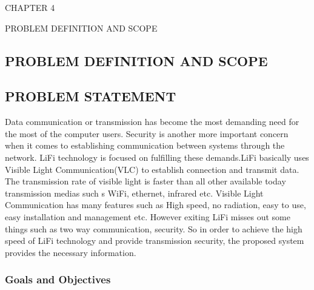 \documentclass[12pt,a4paper]
{article}
\numberwithin{table}{section}
\begin{document}
{{{\begin{minipage}{15cm}


\vspace{4 in}
 \begin{center} 
\begin{Huge}
CHAPTER 4

\vspace{0.5 in}

PROBLEM DEFINITION AND SCOPE
\end{Huge}

\end{center}
\end{minipage}

\newpage
\begin{center}
\section{PROBLEM DEFINITION AND SCOPE}
\end{center}
 {\setlength{\baselineskip}{1.0\baselineskip} 		

  

\hspace{50pt}



\subsection{PROBLEM STATEMENT}

\par \hspace{0.2 in}Data communication or transmission has become the most demanding need for the most of the computer users. Security is another more important concern when it comes to establishing communication between systems through the network. LiFi technology is focused on fulfilling  these demands.LiFi basically uses Visible Light Communication(VLC) to establish connection and transmit data. The transmission rate of visible light is faster than all other available today transmission medias such s WiFi, ethernet, infrared etc. Visible Light Communication has many features such as High speed, no radiation, easy to use, easy installation and management etc. However exiting  LiFi misses out some things such as two way communication, security. So in order to achieve the high speed of LiFi technology and provide transmission security, the proposed system provides the necessary information.

\subsubsection{Goals and Objectives}

}}}}
\end{document}

